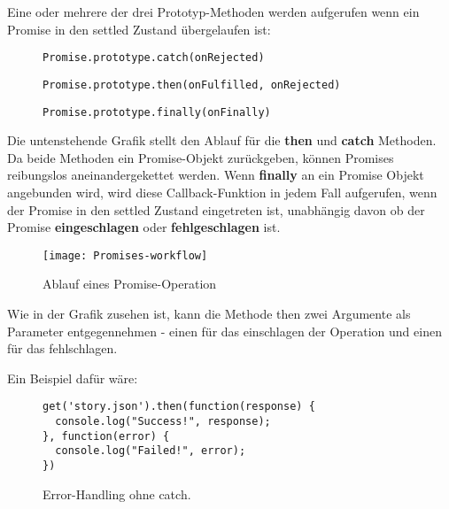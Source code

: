 \noindent
Eine oder mehrere der drei Prototyp-Methoden werden aufgerufen wenn ein Promise in den settled Zustand übergelaufen ist:

\begin{description}

\begin{figure}[H]
\item \begin{lstlisting}
Promise.prototype.catch(onRejected)
\end{lstlisting}
\end{figure}

\begin{figure}[H]
\item \begin{lstlisting}
Promise.prototype.then(onFulfilled, onRejected)
\end{lstlisting}
\end{figure}
 
\begin{figure}[H]
\item \begin{lstlisting} 
Promise.prototype.finally(onFinally)
\end{lstlisting}
\end{figure}
 
\end{description}

\noindent
Die untenstehende Grafik stellt den Ablauf für die \textbf{then} und \textbf{catch} Methoden. Da beide Methoden ein Promise-Objekt zurückgeben, können Promises reibungslos aneinandergekettet werden. Wenn \textbf{finally} an ein Promise Objekt angebunden wird, wird diese Callback-Funktion in jedem Fall aufgerufen, wenn der Promise in den settled Zustand eingetreten ist, unabhängig davon ob der Promise \textbf{eingeschlagen} oder \textbf{fehlgeschlagen} ist.


\begin{figure}[H]
\texttt{[image: Promises-workflow]}
\caption{Ablauf eines Promise-Operation \cite{promise-executor}}
\end{figure}

\noindent
Wie in der Grafik zusehen ist, kann die Methode then zwei Argumente als Parameter entgegennehmen - einen für das einschlagen der Operation und einen für das fehlschlagen.

Ein Beispiel dafür wäre:

\begin{figure}[H]
\begin{lstlisting}
get('story.json').then(function(response) {
  console.log("Success!", response);
}, function(error) {
  console.log("Failed!", error);
})
\end{lstlisting}
\caption{Error-Handling ohne catch. \cite{callback-vs-promises}}
\end{figure}

